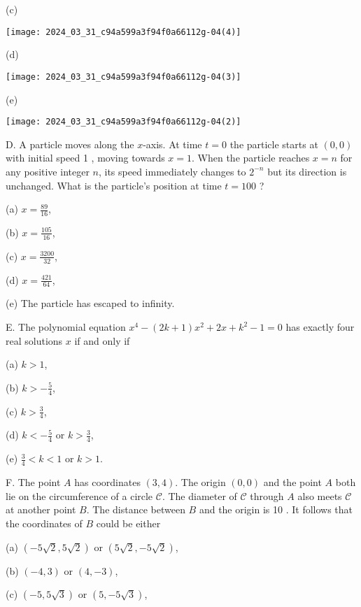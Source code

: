 \documentclass[10pt]{article}
\begin{document}
(c)

\begin{center}
\texttt{[image: 2024\_03\_31\_c94a599a3f94f0a66112g-04(4)]}
\end{center}

(d)

\begin{center}
\texttt{[image: 2024\_03\_31\_c94a599a3f94f0a66112g-04(3)]}
\end{center}

(e)

\begin{center}
\texttt{[image: 2024\_03\_31\_c94a599a3f94f0a66112g-04(2)]}
\end{center}

D. A particle moves along the $x$-axis. At time $t=0$ the particle starts at $(0,0)$ with initial speed 1 , moving towards $x=1$. When the particle reaches $x=n$ for any positive integer $n$, its speed immediately changes to $2^{-n}$ but its direction is unchanged. What is the particle's position at time $t=100$ ?

(a) $x=\frac{89}{16}$,

(b) $x=\frac{105}{16}$,

(c) $x=\frac{3200}{32}$,

(d) $x=\frac{421}{64}$,

(e) The particle has escaped to infinity.

E. The polynomial equation $x^{4}-(2 k+1) x^{2}+2 x+k^{2}-1=0$ has exactly four real solutions $x$ if and only if

(a) $k>1$,

(b) $k>-\frac{5}{4}$,

(c) $k>\frac{3}{4}$,

(d) $k<-\frac{5}{4}$ or $k>\frac{3}{4}$,

(e) $\frac{3}{4}<k<1$ or $k>1$.

F. The point $A$ has coordinates $(3,4)$. The origin $(0,0)$ and the point $A$ both lie on the circumference of a circle $\mathcal{C}$. The diameter of $\mathcal{C}$ through $A$ also meets $\mathcal{C}$ at another point $B$. The distance between $B$ and the origin is 10 . It follows that the coordinates of $B$ could be either

(a) $(-5 \sqrt{2}, 5 \sqrt{2})$ or $(5 \sqrt{2},-5 \sqrt{2})$,

(b) $(-4,3)$ or $(4,-3)$,

(c) $(-5,5 \sqrt{3})$ or $(5,-5 \sqrt{3})$,
\end{document}
